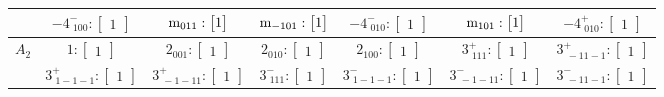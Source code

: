 \documentclass[fleqn,8pt,landscape]{jsarticle}
\begin{document}
\begin{longtable}{ccccccc}
& $ -4^{-}_{\,\,100}:\begin{bmatrix} 1 \end{bmatrix} $ & $ {\rm m}_{011}:\begin{bmatrix} 1 \end{bmatrix} $ & $ {\rm m}_{-101}:\begin{bmatrix} 1 \end{bmatrix} $ & $ -4^{-}_{\,\,010}:\begin{bmatrix} 1 \end{bmatrix} $ & $ {\rm m}_{101}:\begin{bmatrix} 1 \end{bmatrix} $ & $ -4^{+}_{\,\,010}:\begin{bmatrix} 1 \end{bmatrix} $ \\ \hline
$ A_{2} $ & $ 1:\begin{bmatrix} 1 \end{bmatrix} $ & $ 2{}_{001}:\begin{bmatrix} 1 \end{bmatrix} $ & $ 2{}_{010}:\begin{bmatrix} 1 \end{bmatrix} $ & $ 2{}_{100}:\begin{bmatrix} 1 \end{bmatrix} $ & $ 3^{+}_{\,\,111}:\begin{bmatrix} 1 \end{bmatrix} $ & $ 3^{+}_{\,\,-11-1}:\begin{bmatrix} 1 \end{bmatrix} $ \\
& $ 3^{+}_{\,\,1-1-1}:\begin{bmatrix} 1 \end{bmatrix} $ & $ 3^{+}_{\,\,-1-11}:\begin{bmatrix} 1 \end{bmatrix} $ & $ 3^{-}_{\,\,111}:\begin{bmatrix} 1 \end{bmatrix} $ & $ 3^{-}_{\,\,1-1-1}:\begin{bmatrix} 1 \end{bmatrix} $ & $ 3^{-}_{\,\,-1-11}:\begin{bmatrix} 1 \end{bmatrix} $ & $ 3^{-}_{\,\,-11-1}:\begin{bmatrix} 1 \end{bmatrix} $ \\

\end{longtable}
\end{document}
